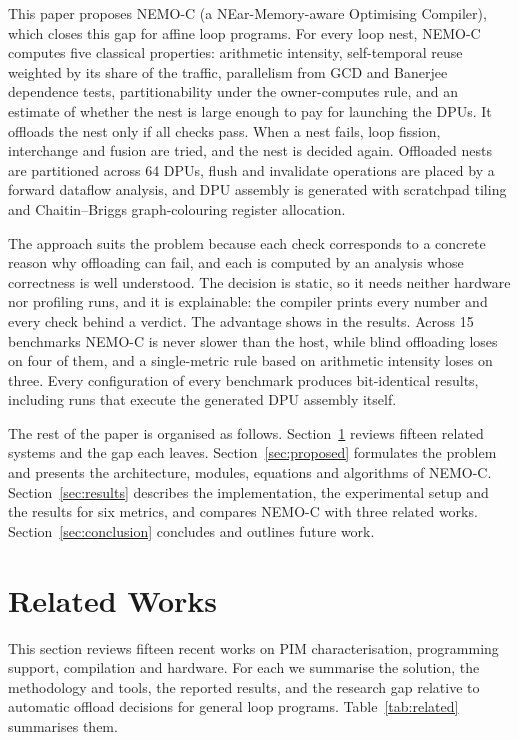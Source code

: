 \documentclass{ieeeaccess}
\begin{document}
This paper proposes NEMO-C (a NEar-Memory-aware Optimising Compiler), which closes this gap for affine loop programs. For every loop nest, NEMO-C computes five classical properties: arithmetic intensity, self-temporal reuse weighted by its share of the traffic, parallelism from GCD and Banerjee dependence tests, partitionability under the owner-computes rule, and an estimate of whether the nest is large enough to pay for launching the DPUs. It offloads the nest only if all checks pass. When a nest fails, loop fission, interchange and fusion are tried, and the nest is decided again. Offloaded nests are partitioned across 64 DPUs, flush and invalidate operations are placed by a forward dataflow analysis, and DPU assembly is generated with scratchpad tiling and Chaitin--Briggs graph-colouring register allocation.

The approach suits the problem because each check corresponds to a concrete reason why offloading can fail, and each is computed by an analysis whose correctness is well understood. The decision is static, so it needs neither hardware nor profiling runs, and it is explainable: the compiler prints every number and every check behind a verdict. The advantage shows in the results. Across 15 benchmarks NEMO-C is never slower than the host, while blind offloading loses on four of them, and a single-metric rule based on arithmetic intensity loses on three. Every configuration of every benchmark produces bit-identical results, including runs that execute the generated DPU assembly itself.

The rest of the paper is organised as follows. Section~\ref{sec:related} reviews fifteen related systems and the gap each leaves. Section~\ref{sec:proposed} formulates the problem and presents the architecture, modules, equations and algorithms of NEMO-C. Section~\ref{sec:results} describes the implementation, the experimental setup and the results for six metrics, and compares NEMO-C with three related works. Section~\ref{sec:conclusion} concludes and outlines future work.

\section{Related Works}
\label{sec:related}

This section reviews fifteen recent works on PIM characterisation, programming support, compilation and hardware. For each we summarise the solution, the methodology and tools, the reported results, and the research gap relative to automatic offload decisions for general loop programs. Table~\ref{tab:related} summarises them.
\end{document}
